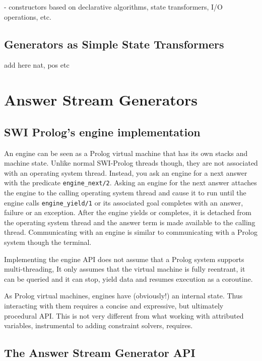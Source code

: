 \documentclass{new_tlp}
\begin{document}
{\Large - constructors based on declarative algorithms, state transformers, I/O operations, etc.}

\subsection{Generators as Simple State Transformers}

{\Large add here nat, pos etc}

\section{Answer Stream Generators}

\subsection{SWI Prolog's engine implementation}

An engine can be seen as a Prolog virtual machine that has its own stacks and machine state. Unlike normal SWI-Prolog threads \cite{swi,swi_threads} though, they are not associated with an operating system thread. Instead, you ask an engine for a next answer with the predicate {\tt engine\_next/2}. Asking an engine for the next answer attaches the engine to the calling operating system thread and cause it to run until the engine calls {\tt engine\_yield/1} or its associated goal completes with an answer, failure or an exception. After the engine yields or completes, it is detached from the operating system thread and the answer term is made available to the calling thread. Communicating with an engine is similar to communicating with a Prolog system though the terminal.

Implementing the engine API does not assume that a Prolog system supports multi-threading, It only assumes that the virtual machine is fully reentrant, it can be queried and it can stop, yield data and resumes execution as a coroutine.

As Prolog virtual machines, engines have (obviously!) an internal state. Thus interacting with them requires a concise and expressive, but ultimately procedural API. This is not very different from what working with attributed variables, instrumental to adding constraint solvers, requires.

\subsection{The Answer Stream Generator API}
\end{document}
